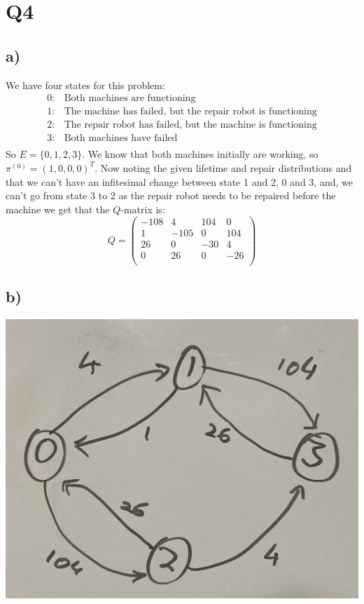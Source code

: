 \documentclass{article}
\begin{document}
\section*{Q4}
\subsection*{a)}
We have four states for this problem:
\begin{align*}
0:&\text{Both machines are functioning}\\
1:&\text{The machine has failed, but the repair robot is functioning}\\
2:&\text{The repair robot has failed, but the machine is functioning}\\
3:&\text{Both machines have failed}\\
\end{align*}
So $E=\{0,1,2,3\}$. We know that both machines initially are working, so $\pi^{(0)}=(1,0,0,0)^T$. Now noting the given lifetime and repair distributions and that we can't have an infitesimal change between state 1 and 2, 0 and 3, and, we can't go from state 3 to 2 as the repair robot needs to be repaired before the machine we get that the $Q$-matrix is:
$$Q=\begin{pmatrix}
-108 & 4 & 104 & 0\\
1 & -105 & 0 & 104\\
26 & 0 & -30 & 4\\
0 & 26 & 0 & -26\\
\end{pmatrix}$$
\subsection*{b)}
\includegraphics[scale=0.2]{CTMC.jpeg}
\end{document}
